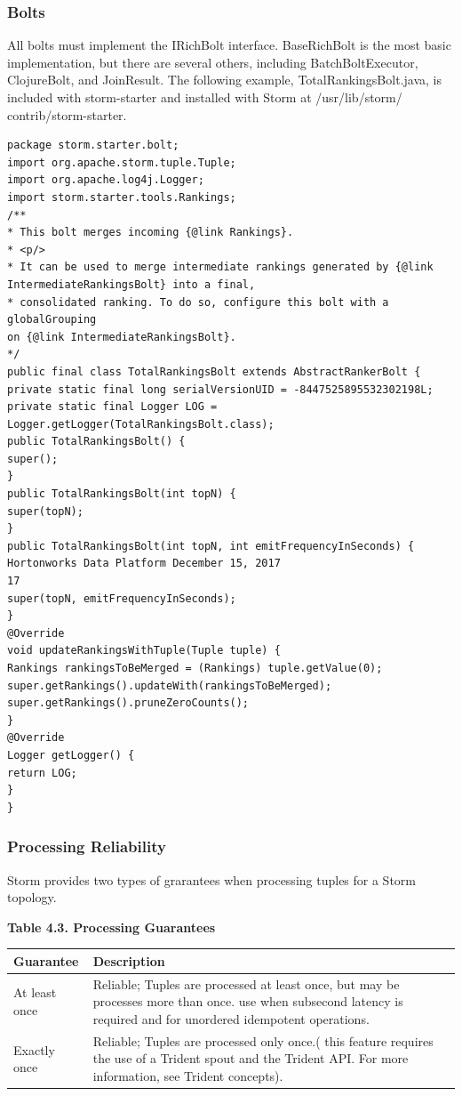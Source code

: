 \documentclass{hcmutarticle}
\begin{document}
\subsubsection{Bolts\\}
All bolts must implement the IRichBolt interface. BaseRichBolt is the most
basic implementation, but there are several others, including BatchBoltExecutor,
ClojureBolt, and JoinResult. The following example, TotalRankingsBolt.java,
is included with storm-starter and installed with Storm at /usr/lib/storm/
contrib/storm-starter.
\begin{lstlisting}
package storm.starter.bolt;
import org.apache.storm.tuple.Tuple;
import org.apache.log4j.Logger;
import storm.starter.tools.Rankings;
/**
* This bolt merges incoming {@link Rankings}.
* <p/>
* It can be used to merge intermediate rankings generated by {@link
IntermediateRankingsBolt} into a final,
* consolidated ranking. To do so, configure this bolt with a globalGrouping
on {@link IntermediateRankingsBolt}.
*/
public final class TotalRankingsBolt extends AbstractRankerBolt {
private static final long serialVersionUID = -8447525895532302198L;
private static final Logger LOG = Logger.getLogger(TotalRankingsBolt.class);
public TotalRankingsBolt() {
super();
}
public TotalRankingsBolt(int topN) {
super(topN);
}
public TotalRankingsBolt(int topN, int emitFrequencyInSeconds) {
Hortonworks Data Platform December 15, 2017
17
super(topN, emitFrequencyInSeconds);
}
@Override
void updateRankingsWithTuple(Tuple tuple) {
Rankings rankingsToBeMerged = (Rankings) tuple.getValue(0);
super.getRankings().updateWith(rankingsToBeMerged);
super.getRankings().pruneZeroCounts();
}
@Override
Logger getLogger() {
return LOG;
}
}
\end{lstlisting}
\subsubsection{Processing Reliability\\}
Storm provides two types of grarantees when processing tuples for a Storm topology.

\textbf{Table 4.3. Processing Guarantees}
\begin{center}
	\begin{tabular}{|l| p{12cm} |}
		\hline
			\textbf{Guarantee} & \textbf{Description} \\
		\hline
			At least once & Reliable; Tuples are processed at least once, but may be processes more than once. use when subsecond latency is required and for unordered idempotent operations.\\
		\hline
			Exactly once & Reliable; Tuples are processed only once.( this feature requires the use of a Trident spout and the Trident API. For more information, see Trident concepts).\\
		\hline
	\end{tabular}	
\end{center}
\end{document}
